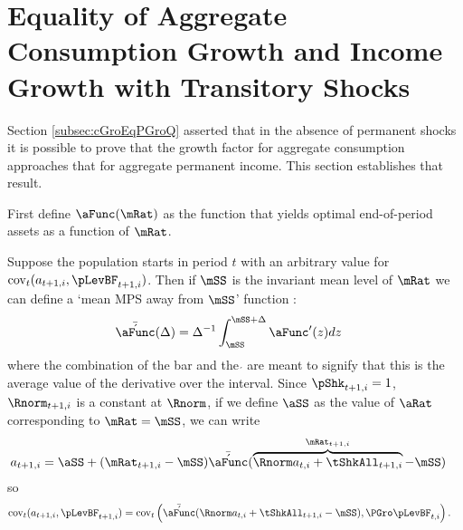 \documentclass[../BufferStockTheory.tex]{subfiles}
\begin{document}
\section{Equality of Aggregate Consumption Growth and Income Growth with Transitory Shocks}\label{sec:ApndxCGroIsPGro}

Section \ref{subsec:cGroEqPGroQ} asserted that in the absence of permanent shocks it is possible to prove
that the growth factor for aggregate consumption approaches that for aggregate permanent
income.  This section establishes that result.

First define $\aFunc(\mRat)$ as the function that yields optimal end-of-period assets as a function of $\mRat$.

Suppose the population starts in period $t$ with an arbitrary value for
 $\mbox{cov}_{t}(a_{t+1,i},\pLevBF_{t+1,i})$. 
 Then if $\mSS$ is the invariant mean level of $\mRat$ we can define a `mean MPS away from $\mSS$' function
 \newcommand{\AMPS}{\bar{\acute{\aFunc}}}:
\begin{equation}\begin{gathered}\begin{aligned}
 \AMPS(\Delta)  & =  \Delta^{-1}\int_{\mSS}^{\mSS+\Delta} \aFunc^{\prime}(z)
 dz \label{eq:checkaFunc} \nonumber
\end{aligned}\end{gathered}\end{equation}
where the combination of the bar and the $\acute{}$ are meant to signify that this is the average value of the derivative over the interval.
Since $\pShk_{t+1,i}=1$, $\Rnorm_{t+1,i}$ is a constant at $\Rnorm$, if we define $\aSS$ as the value of $\aRat$ corresponding to $\mRat = \mSS$, we can write
\begin{equation}\begin{gathered}\begin{aligned}
  a_{t+1,i} 
& =   \aSS+(\mRat_{t+1,i}-\mSS)\AMPS(\overbrace{\Rnorm
    a_{t,i}+\tShkAll_{t+1,i}}^{\mRat_{t+1,i}}-\mSS) \nonumber
\end{aligned}\end{gathered}\end{equation}
so
\begin{equation}\begin{gathered}\begin{aligned}
\mbox{cov}_{t}(a_{t+1,i},\pLevBF_{t+1,i})
 & = \mbox{cov}_{t}\left(\AMPS(\Rnorm  a_{t,i}+\tShkAll_{t+1,i}-\mSS)
  ,\PGro   \pLevBF_{t,i}\right). \nonumber
\end{aligned}\end{gathered}\end{equation}
\end{document}
